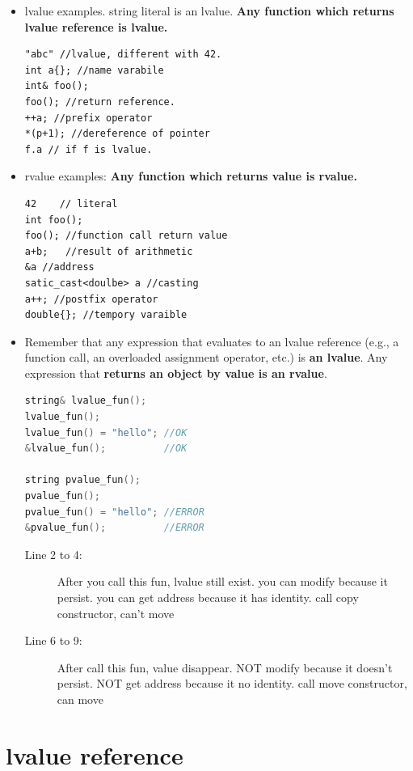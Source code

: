 \documentclass[a4paper,11pt,twoside]{book}
\begin{document}
\begin{itemize}
\item lvalue examples. string literal is an lvalue. \textbf{Any function which returns lvalue reference is lvalue.}
\begin{lstlisting}
"abc" //lvalue, different with 42.
int a{}; //name varabile 
int& foo();
foo(); //return reference.
++a; //prefix operator
*(p+1); //dereference of pointer
f.a // if f is lvalue.
\end{lstlisting}
	
	\item rvalue examples: \textbf{Any function which returns value is rvalue.}
\begin{lstlisting}
42    // literal
int foo(); 
foo(); //function call return value
a+b;   //result of arithmetic
&a //address 
satic_cast<doulbe> a //casting
a++; //postfix operator
double{}; //tempory varaible
\end{lstlisting}

	\item Remember that any expression that evaluates to an lvalue reference (e.g., a function call, an overloaded assignment operator, etc.) is \textbf{an lvalue}. Any expression that \textbf{returns an object by value is an rvalue}.

\begin{lstlisting}[frame=single, language=c++, mathescape=true]
string& lvalue_fun();
lvalue_fun(); 
lvalue_fun() = "hello"; //OK
&lvalue_fun();          //OK
	
string pvalue_fun();
pvalue_fun(); 
pvalue_fun() = "hello"; //ERROR
&pvalue_fun();          //ERROR
\end{lstlisting}

\begin{description}
	\item[Line 2 to 4:] After you call this fun, lvalue still exist. you can modify because it persist. you can get address because it has identity. call copy constructor, can't move
	
	\item[Line 6 to 9:]  After call this fun, value disappear. NOT modify because it doesn't persist. NOT get address because it no identity. call move constructor, can move
\end{description}


\end{itemize}

\section{lvalue reference}
\end{document}
